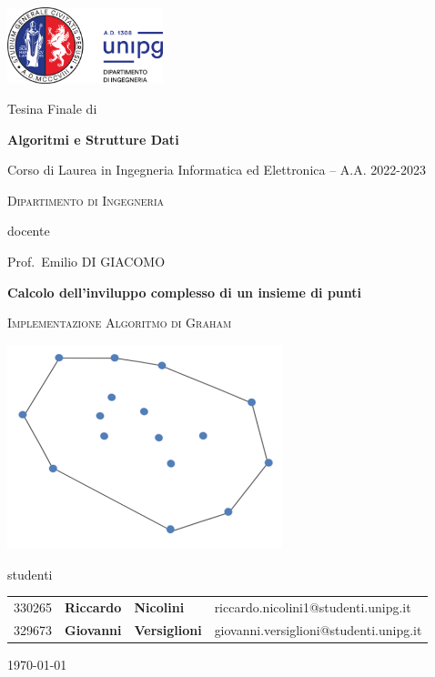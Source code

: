 \documentclass[12pt,a4paper]{report}
\begin{document}
\begin{titlepage}

	\centering
	\includegraphics[width=0.34\textwidth]{logo-unipg}\par\vspace{1cm}
	\large{Tesina Finale di}\par
	\large{\textbf{Algoritmi e Strutture Dati}}\par
	\small{Corso di Laurea in Ingegneria Informatica ed Elettronica -- A.A. 2022-2023}\par
	\textsc{\small{Dipartimento di Ingegneria}}\par

	\vspace{0.5cm}
	docente\par
	Prof.~Emilio \textsc{DI GIACOMO}

	\vspace{2cm}
	\textbf{\huge{Calcolo dell'inviluppo complesso di un insieme di punti}}\par
	\vspace{0.2cm}
	  \textsc{Implementazione Algoritmo di Graham}\par
	
	\vspace{1.5cm}
	\includegraphics[width=0.6\textwidth]{CH.png}\par
 
	\vspace{1cm}
	\large{studenti}\par
	\vspace{0.5cm}
	\begin{tabular}{ l l l l }
	\large{330265} & \large{\textbf{Riccardo}} & \large{\textbf{Nicolini}} &        \large{riccardo.nicolini1@studenti.unipg.it}\\
	\large{329673} & \large{\textbf{Giovanni}} & \large{\textbf{Versiglioni}} &     \large{giovanni.versiglioni@studenti.unipg.it}\\
	\end{tabular}

    \vfill
    \raggedright
    \vspace{0.5cm}
    \small{\today}
\end{titlepage}
\restoregeometry
\end{document}
